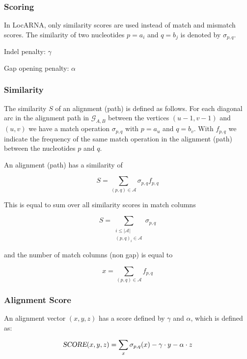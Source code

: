 \documentclass{article}
\begin{document}
\subsubsection*{Scoring}

In LocARNA, only similarity scores are used instead of match and mismatch
scores. The similarity of two nucleotides $p=a_i$ and $q=b_j$ is
denoted by $\sigma_{p,q}$.

Indel penalty: $\gamma$

Gap opening penalty: $\alpha$

\subsubsection*{Similarity}

The similarity $S$ of an alignment (path) is defined as follows. For each
diagonal arc in the alignment path in $\mathcal{G}_{A,B}$ between the
vertices $(u-1,v-1)$ and $(u,v)$ we have a match operation $\sigma_{p,q}$ with
$p=a_u$ and $q=b_v$. With $f_{p,q}$ we indicate the frequency of the same match
operation in the alignment (path) between the nucleotides $p$ and $q$.

An alignment (path) has a similarity of

\begin{equation}
S = \sum\limits_{(p,q) \in \mathcal{A}}\sigma_{p,q}f_{p,q} 
\end{equation}

This is equal to sum over all similarity scores in match columns 

\begin{equation}
S = \sum\limits_{\substack{i\leq|\mathcal{A}|\\ (p,q)_i \in
\mathcal{A}}}\sigma_{p,q}
\end{equation}

and the number of match columns (non gap) is equal to

\begin{equation}
x = \sum\limits_{(p,q) \in \mathcal{A}}f_{p,q} 
\end{equation}

\subsubsection*{Alignment Score}

An alignment vector $(x,y,z)$ has a score defined by $\gamma$ and $\alpha$,
which is defined as:

\begin{equation}
\textsl{SCORE}(x,y,z) = \sum_x \sigma_{p,q}(x) - \gamma \cdot y-
\alpha\cdot z
\end{equation}
\end{document}
